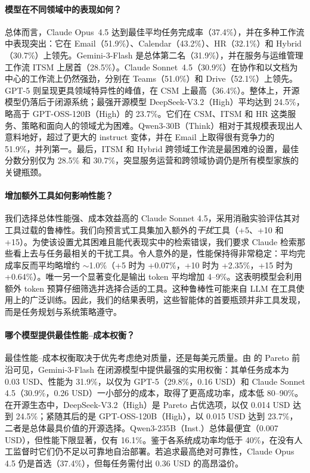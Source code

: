 \paragraph{模型在不同领域中的表现如何？}
总体而言，Claude Opus~4.5 达到最佳平均任务完成率（37.4\%），并在多种工作流中表现突出：它在 Email（51.9\%）、Calendar（43.2\%）、HR（32.1\%）和 Hybrid（30.7\%）上领先。Gemini-3-Flash 是总体第二名（31.9\%），并在服务与运维管理工作流 ITSM 上居首（28.5\%）。Claude Sonnet~4.5（30.9\%）在协作和以文档为中心的工作流上仍然强劲，分别在 Teams（51.0\%）和 Drive（52.1\%）上领先。GPT-5 则呈现更具领域特异性的峰值，在 CSM 上最高（36.4\%）。整体上，开源模型仍落后于闭源系统；最强开源模型 DeepSeek-V3.2（High）平均达到 24.5\%，略高于 GPT-OSS-120B（High）的 23.7\%。它们在 CSM、ITSM 和 HR 这类服务、策略和面向人的领域尤为困难。Qwen3-30B（Think）相对于其规模表现出人意料地好，超过了更大的 instruct 变体，并在 Email 上取得很有竞争力的 51.9\%，并列第一。最后，ITSM 和 Hybrid 跨领域工作流是最困难的设置，最佳分数分别仅为 28.5\% 和 30.7\%，突显服务运营和跨领域协调仍是所有模型家族的关键瓶颈。

\paragraph{增加额外工具如何影响性能？}
我们选择总体性能强、成本效益高的 Claude Sonnet 4.5，采用消融实验评估其对工具过载的鲁棒性。我们向预言式工具集加入额外的\textit{干扰}工具（+5、+10 和 +15）。为使该设置尤其困难且能代表现实中的检索错误，我们要求 Claude 检索那些看上去与任务最相关的干扰工具。令人意外的是，性能保持得非常稳定：平均完成率反而平均略增约 $\sim$1.0\%（+5 时为 +0.07\%，+10 时为 +2.35\%，+15 时为 +0.64\%）。唯一另一个显著变化是输出 token 平均增加 4--9\%。这表明模型会利用额外 token 预算仔细筛选并选择合适的工具。这种鲁棒性可能来自 LLM 在工具使用上的广泛训练。因此，我们的结果表明，这些智能体的首要瓶颈并非工具发现，而是任务规划与系统策略遵守。

\paragraph{哪个模型提供最佳性能--成本权衡？}
最佳性能--成本权衡取决于优先考虑绝对质量，还是每美元质量。由  的 Pareto 前沿可见，Gemini-3-Flash 在闭源模型中提供最强的实用权衡：其单任务成本为 0.03 USD、性能为 31.9\%，以仅为 GPT-5（29.8\%，0.16 USD）和 Claude Sonnet 4.5（30.9\%，0.26 USD）一小部分的成本，取得了更高成功率，成本低 80--90\%。在开源生态中，DeepSeek-V3.2（High）是 Pareto 占优选项，以仅 0.014 USD 达到 24.5\%；紧随其后的是 GPT-OSS-120B（High），以 0.015 USD 达到 23.7\%，二者是总体最具价值的开源选择。Qwen3-235B（Inst.）总体最便宜（0.007 USD），但性能下限显著，仅有 16.1\%。鉴于各系统成功率均低于 40\%，在没有人工监督时它们仍不足以可靠地自治部署。若追求最高绝对可靠性，Claude Opus 4.5 仍是首选（37.4\%），但每任务需付出 0.36 USD 的高昂溢价。

